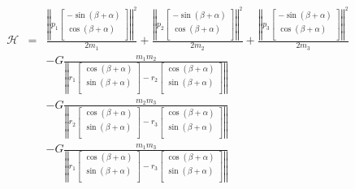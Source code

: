 \begin{itemize}
\begin{eqnarray*}
		\mathcal{H} &=& \frac{\left|\left| p_1 \begin{bmatrix}
				-\sin(\beta + \alpha)\\
				\cos(\beta + \alpha)\\
			\end{bmatrix}\right|\right|^2}{2m_1} +\frac{\left|\left| p_2 \begin{bmatrix}
			-\sin(\beta + \alpha)\\
			\cos(\beta + \alpha)\\
		\end{bmatrix}\right|\right|^2}{2m_2}+\frac{\left|\left| p_3 \begin{bmatrix}
		-\sin(\beta + \alpha)\\
		\cos(\beta + \alpha)\\
	\end{bmatrix}\right|\right|^2}{2m_3}\\& & - G\frac{m_1m_2}{\left|\left|r_1 \begin{bmatrix}
	\cos(\beta + \alpha)\\
	\sin(\beta + \alpha)\\
\end{bmatrix} - r_2 \begin{bmatrix}
\cos(\beta + \alpha)\\
\sin(\beta + \alpha)\\
\end{bmatrix}\right|\right|}\\
& &-G\frac{m_2m_3}{\left|\left|r_2 \begin{bmatrix}
\cos(\beta + \alpha)\\
\sin(\beta + \alpha)\\
\end{bmatrix} - r_3 \begin{bmatrix}
\cos(\beta + \alpha)\\
\sin(\beta + \alpha)\\
\end{bmatrix}\right|\right|}\\
& &-G\frac{m_1m_3}{\left|\left|r_1 \begin{bmatrix}
\cos(\beta + \alpha)\\
\sin(\beta + \alpha)\\
\end{bmatrix} - r_3 \begin{bmatrix}
\cos(\beta + \alpha)\\
\sin(\beta + \alpha)\\
\end{bmatrix}\right|\right|} 

\end{eqnarray*}
\end{itemize}
